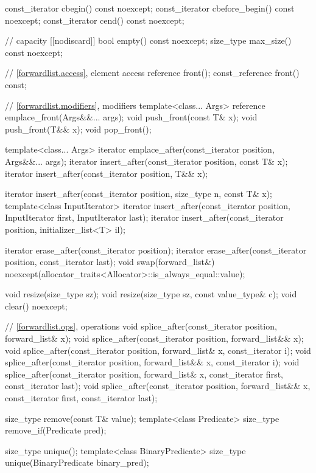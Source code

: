\begin{codeblock}
{{    const_iterator cbegin() const noexcept;
    const_iterator cbefore_begin() const noexcept;
    const_iterator cend() const noexcept;

    // capacity
    [[nodiscard]] bool empty() const noexcept;
    size_type max_size() const noexcept;

    // \ref{forwardlist.access}, element access
    reference front();
    const_reference front() const;

    // \ref{forwardlist.modifiers}, modifiers
    template<class... Args> reference emplace_front(Args&&... args);
    void push_front(const T& x);
    void push_front(T&& x);
    void pop_front();

    template<class... Args> iterator emplace_after(const_iterator position, Args&&... args);
    iterator insert_after(const_iterator position, const T& x);
    iterator insert_after(const_iterator position, T&& x);

    iterator insert_after(const_iterator position, size_type n, const T& x);
    template<class InputIterator>
      iterator insert_after(const_iterator position, InputIterator first, InputIterator last);
    iterator insert_after(const_iterator position, initializer_list<T> il);

    iterator erase_after(const_iterator position);
    iterator erase_after(const_iterator position, const_iterator last);
    void swap(forward_list&)
      noexcept(allocator_traits<Allocator>::is_always_equal::value);

    void resize(size_type sz);
    void resize(size_type sz, const value_type& c);
    void clear() noexcept;

    // \ref{forwardlist.ops},  operations
    void splice_after(const_iterator position, forward_list& x);
    void splice_after(const_iterator position, forward_list&& x);
    void splice_after(const_iterator position, forward_list& x, const_iterator i);
    void splice_after(const_iterator position, forward_list&& x, const_iterator i);
    void splice_after(const_iterator position, forward_list& x,
                      const_iterator first, const_iterator last);
    void splice_after(const_iterator position, forward_list&& x,
                      const_iterator first, const_iterator last);

    size_type remove(const T& value);
    template<class Predicate> size_type remove_if(Predicate pred);

    size_type unique();
    template<class BinaryPredicate> size_type unique(BinaryPredicate binary_pred);

}}
\end{codeblock}
